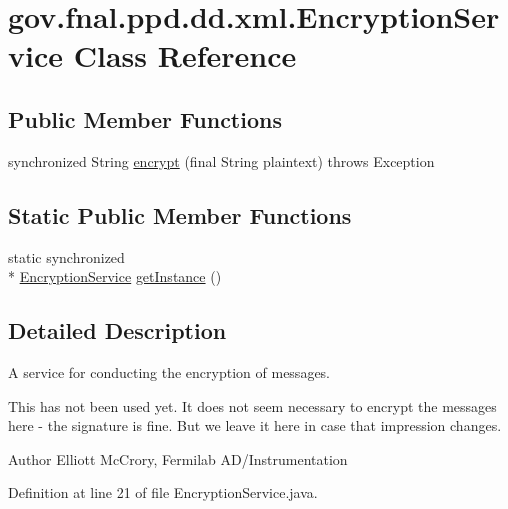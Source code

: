 \hypertarget{classgov_1_1fnal_1_1ppd_1_1dd_1_1xml_1_1EncryptionService}{\section{gov.\-fnal.\-ppd.\-dd.\-xml.\-Encryption\-Service Class Reference}
\label{classgov_1_1fnal_1_1ppd_1_1dd_1_1xml_1_1EncryptionService}
}
\subsection*{Public Member Functions}
\begin{DoxyCompactItemize}
\item 
synchronized String \hyperlink{classgov_1_1fnal_1_1ppd_1_1dd_1_1xml_1_1EncryptionService_acc22895b4cdbfad7241cb9aef7e44386}{encrypt} (final String plaintext)  throws Exception 
\end{DoxyCompactItemize}
\subsection*{Static Public Member Functions}
\begin{DoxyCompactItemize}
\item 
static synchronized \\*
\hyperlink{classgov_1_1fnal_1_1ppd_1_1dd_1_1xml_1_1EncryptionService}{Encryption\-Service} \hyperlink{classgov_1_1fnal_1_1ppd_1_1dd_1_1xml_1_1EncryptionService_af86ad51ad97df1cb699364bb83322da5}{get\-Instance} ()
\end{DoxyCompactItemize}


\subsection{Detailed Description}
A service for conducting the encryption of messages.

This has not been used yet. It does not seem necessary to encrypt the messages here -\/ the signature is fine. But we leave it here in case that impression changes.

\begin{DoxyAuthor}{Author}
Elliott Mc\-Crory, Fermilab A\-D/\-Instrumentation 
\end{DoxyAuthor}


Definition at line 21 of file Encryption\-Service.\-java.



